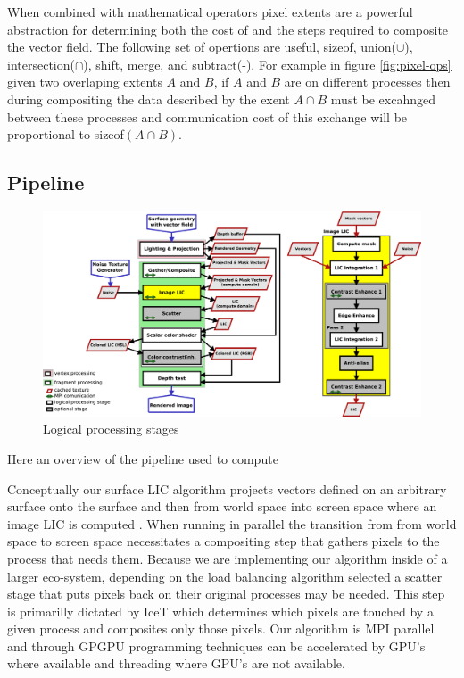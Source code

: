 \documentclass[a4paper,10pt]{article}
\begin{document}
When combined with mathematical operators pixel extents are a powerful abstraction for determining both the cost of and the steps required to composite the vector field. The following set of opertions are useful, sizeof, union($\cup$), intersection($\cap$), shift, merge, and subtract(-). For example in figure \ref{fig:pixel-ops} given two overlaping extents $A$ and $B$, if $A$ and $B$ are on different processes then during compositing the data described by the exent $A \cap B$ must be excahnged between these processes and communication cost of this exchange will be proportional to sizeof$(A \cap B)$.

\subsection{Pipeline}
\begin{figure}[ht]
 \centering
 \includegraphics[width=\textwidth]{./images-data/dia-serial/surfacelic-painter-and-lic2d-flow.png}
 \caption{Logical processing stages}
 \label{fig:flow}
\end{figure}

Here an overview of the pipeline used to compute 

Conceptually our surface LIC algorithm projects vectors defined on an arbitrary surface onto the surface and then from world space into screen space where an image LIC is computed\cite{surfacelic} \cite{imagelic}. When running in parallel the transition from from world space to screen space necessitates a compositing step that gathers pixels to the process that needs them. Because we are implementing our algorithm inside of a larger eco-system, depending on the load balancing algorithm selected a scatter stage that puts pixels back on their original processes may be needed. This step is primarilly dictated by IceT which determines which pixels are touched by a given process and composites only those pixels. Our algorithm is MPI parallel and through GPGPU programming techniques can be accelerated by GPU's where available and threading where GPU's are not available\cite{xsede13}.
\end{document}
